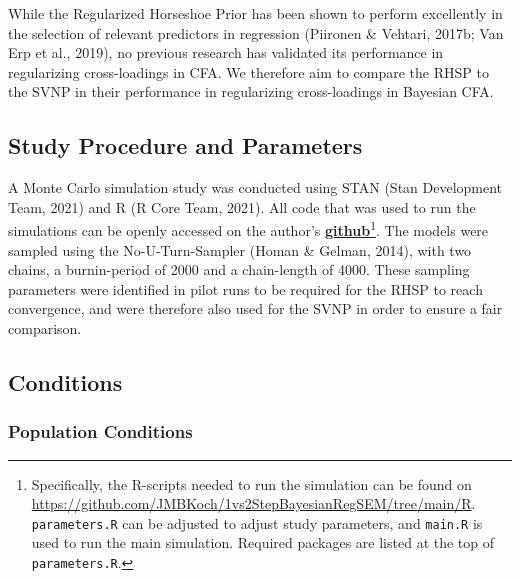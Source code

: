 \documentclass[
  man, donotrepeattitle,floatsintext]{apa6}
\begin{document}
While the Regularized Horseshoe Prior has been shown to perform excellently in the selection of relevant predictors in regression (Piironen \& Vehtari, 2017b; Van Erp et al., 2019), no previous research has validated its performance in regularizing cross-loadings in CFA. We therefore aim to compare the RHSP to the SVNP in their performance in regularizing cross-loadings in Bayesian CFA.

\hypertarget{study-procedure-and-parameters}{%
\subsection{Study Procedure and Parameters}\label{study-procedure-and-parameters}}

A Monte Carlo simulation study was conducted using STAN (Stan Development Team, 2021) and R (R Core Team, 2021). All code that was used to run the simulations can be openly accessed on the author's \href{https://github.com/JMBKoch/1vs2StepBayesianRegSEM}{\textbf{github}}\footnote{Specifically, the R-scripts needed to run the simulation can be found on \url{https://github.com/JMBKoch/1vs2StepBayesianRegSEM/tree/main/R}. \texttt{parameters.R} can be adjusted to adjust study parameters, and \texttt{main.R} is used to run the main simulation. Required packages are listed at the top of \texttt{parameters.R}.}. The models were sampled using the No-U-Turn-Sampler (Homan \& Gelman, 2014), with two chains, a burnin-period of 2000 and a chain-length of 4000. These sampling parameters were identified in pilot runs to be required for the RHSP to reach convergence, and were therefore also used for the SVNP in order to ensure a fair comparison.

\hypertarget{conditions}{%
\subsection{Conditions}\label{conditions}}

\hypertarget{population-conditions}{%
\subsubsection{Population Conditions}\label{population-conditions}}
\end{document}
